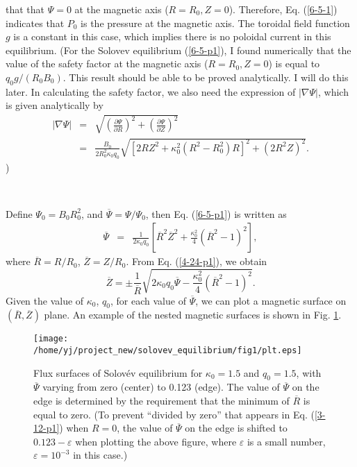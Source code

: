 \documentclass{llncs}
\begin{document}
that that $\Psi = 0$ at the magnetic axis ($R = R_0, Z = 0$). Therefore, Eq.
(\ref{6-5-1}) indicates that $P_0$ is the pressure at the magnetic axis. The
toroidal field function $g$ is a constant in this case, which implies there is
no poloidal current in this equilibrium. (For the Solovev equilibrium
(\ref{6-5-p1}), I found numerically that the value of the safety factor at the
magnetic axis ($R = R_0, Z = 0$) is equal to $q_0 g / (R_0 B_0)$. This result
should be able to be proved analytically. I will do this later. In calculating
the safety factor, we also need the expression of $| \nabla \Psi |$, which is
given analytically by
\begin{eqnarray}
  | \nabla \Psi | & = & \sqrt{\left( \frac{\partial \Psi}{\partial R}
  \right)^2 + \left( \frac{\partial \Psi}{\partial Z} \right)^2} \nonumber\\
  & = & \frac{B_0}{2 R_0^2 \kappa_0 q_0} \sqrt{[2 R Z^2 + \kappa_0^2 (R^2 -
  R_0^2) R]^2 + (2 R^2 Z)^2} . 
\end{eqnarray}
)

\

Define $\Psi_0 = B_0 R_0^2$, and $\overline{\Psi} = \Psi / \Psi_0$, then Eq.
(\ref{6-5-p1}) is written as
\begin{eqnarray}
  \overline{\Psi} & = & \frac{1}{2 \kappa_0 q_0} \left[ \overline{R}^2
  \overline{Z}^2 + \frac{\kappa_0^2}{4} (\overline{R}^2 - 1)^2 \right], 
  \label{4-24-p1}
\end{eqnarray}
where $\overline{R} = R / R_0$, $\overline{Z} = Z / R_0$. From Eq.
(\ref{4-24-p1}), we obtain
\begin{equation}
  \label{3-12-p1} \overline{Z} = \pm \frac{1}{\overline{R}} \sqrt{2 \kappa_0
  q_0 \overline{\Psi} - \frac{\kappa_0^2}{4} (\overline{R}^2 - 1)^2} .
\end{equation}
Given the value of $\kappa_0$, $q_0$, for each value of $\overline{\Psi}$, we
can plot a magnetic surface on $(\overline{R}, \overline{Z})$ plane. An
example of the nested magnetic surfaces is shown in Fig. \ref{4-24-p6}.

\begin{figure}[h]
  \texttt{[image: /home/yj/project\_new/solovev\_equilibrium/fig1/plt.eps]}
  \caption{\label{4-24-p6}Flux surfaces of Solov{\'e}v equilibrium for
  $\kappa_0 = 1.5$ and $q_0 = 1.5$, with $\overline{\Psi}$ varying from zero
  (center) to 0.123 (edge). The value of $\overline{\Psi}$ on the edge is
  determined by the requirement that the minimum of $\overline{R}$ is equal to
  zero. (To prevent ``divided by zero'' that appears in Eq. (\ref{3-12-p1})
  when $R = 0$, the value of $\overline{\Psi}$ on the edge is shifted to
  $0.123 - \varepsilon$ when plotting the above figure, where $\varepsilon$ is
  a small number, $\varepsilon = 10^{- 3}$ in this case.)}
\end{figure}
\end{document}
